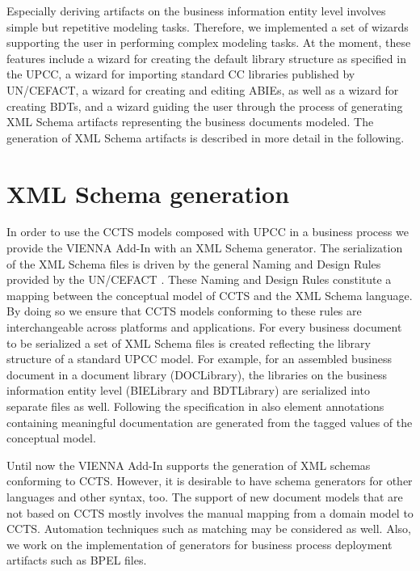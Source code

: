 \documentclass{acm_proc_article-sp}
\begin{document}
Especially deriving artifacts on the business information entity level involves simple but repetitive modeling tasks. Therefore, we implemented a set of wizards supporting the user in performing complex modeling tasks. At the moment, these features include a wizard for creating the default library structure as specified in the UPCC, a wizard for importing standard CC libraries published by UN/CEFACT, a wizard for creating and editing ABIEs, as well as a wizard for creating BDTs, and a wizard guiding the user through the process of generating XML Schema artifacts representing the business documents modeled. The generation of XML Schema artifacts is described in more detail in the following. 

\section{XML Schema generation}
In order to use the CCTS models composed with UPCC in a business process we provide the VIENNA Add-In with an XML Schema generator. The serialization of the XML Schema files is driven by the general Naming and Design Rules provided by the UN/CEFACT \cite{CEFACT:NDR}. These Naming and Design Rules constitute a mapping between the conceptual model of CCTS and the XML Schema language. By doing so we ensure that CCTS models conforming to these rules are interchangeable across platforms and applications. For every business document to be serialized a set of XML Schema files is created reflecting the library structure of a standard UPCC model. For example, for an assembled business document in a document library (DOCLibrary), the libraries on the business information entity level (BIELibrary and BDTLibrary) are serialized into separate files as well. Following the specification in \cite{CEFACT:NDR} also element annotations containing meaningful documentation are generated from the tagged values of the conceptual model. 

Until now the VIENNA Add-In supports the generation of XML schemas conforming to CCTS. However, it is desirable to have schema generators for other languages and other syntax, too. The support of new document models that are not based on CCTS mostly involves the manual mapping from a domain model to CCTS. Automation techniques such as matching may be considered as well. Also, we work on the implementation of generators for business process deployment artifacts such as BPEL files.


\end{document}
